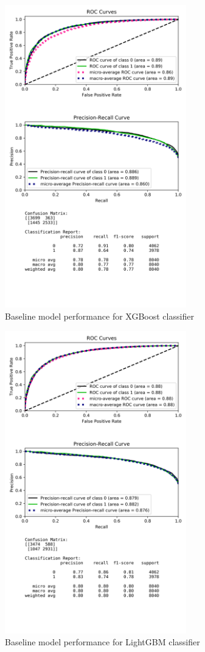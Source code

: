 \documentclass[journal,twoside,web]{ieeecolor}
\begin{document}
\begin{figure}[h!]
  \centering
  \includegraphics[width=3.1in]{project/code/preliminary-xgboost-downsampled.png}
  \caption{Baseline model performance for XGBoost classifier}
  \label{fig:prelim-xgboost}
\end{figure}

\begin{figure}[h!]
  \centering
  \includegraphics[width=3.1in]{project/code/preliminary-lightGBM-downsampled.png}
  \caption{Baseline model performance for LightGBM classifier}
  \label{fig:prelim-lgbm}
\end{figure}
\end{document}
